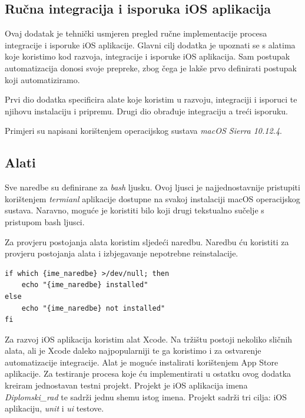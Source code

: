 \documentclass[times, utf8, diplomski, numeric]{fer}
\begin{document}
\begin{appendices}



\chapter{Ručna integracija i isporuka iOS aplikacija}

Ovaj dodatak je tehnički usmjeren pregled ručne implementacije procesa integracije i isporuke iOS aplikacije. Glavni cilj dodatka je upoznati se s alatima koje koristimo kod razvoja, integracije i isporuke iOS aplikacija. Sam postupak automatizacija donosi svoje prepreke, zbog čega je lakše prvo definirati postupak koji automatiziramo.

Prvi dio dodatka specificira alate koje koristim u razvoju, integraciji i isporuci te njihovu instalaciju i pripremu. Drugi dio obrađuje integraciju a treći isporuku.

Primjeri su napisani korištenjem operacijskog sustava \textit{macOS Sierra 10.12.4}.

\section{Alati} \label{AlatiBuild}

Sve naredbe su definirane za \textit{bash} ljusku. Ovoj ljusci je najjednostavnije pristupiti korištenjem \textit{termianl} aplikacije dostupne na svakoj instalaciji macOS operacijskog sustava. Naravno, moguće je koristiti bilo koji drugi tekstualno sučelje s pristupom bash ljusci.

Za provjeru postojanja alata koristim sljedeći naredbu. Naredbu ću koristiti za provjeru postojanja alata i izbjegavanje nepotrebne reinstalacije.

\begin{verbatim}
if which {ime_naredbe} >/dev/null; then
    echo "{ime_naredbe} installed"
else
    echo "{ime_naredbe} not installed"
fi
\end{verbatim}

Za razvoj iOS aplikacija koristim alat Xcode. Na tržištu postoji nekoliko sličnih alata, ali je Xcode daleko najpopularniji te ga koristimo i za ostvarenje automatizacije integracije. Alat je moguće instalirati korištenjem App Store aplikacije. Za testiranje procesa koje ću implementirati u ostatku ovog dodatka kreiram jednostavan testni projekt. Projekt je iOS aplikacija imena \textit{Diplomski\_rad} te sadrži jednu shemu istog imena. Projekt sadrži tri cilja: iOS aplikaciju, \textit{unit} i \textit{ui} testove.


\end{appendices}
\end{document}
